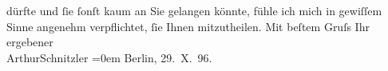 \begin{ledgroupsized}[t]{13cm}
               dürfte und ſie ſonſt kaum an Sie {\pb}gelangen
               könnte, fühle ich mich in gewiſſem Sinne angenehm verpflichtet, ſie Ihnen
               mitzutheilen.\pend
           \pstart
           Mit beſtem Gruſs Ihr ergebener{\\[\baselineskip]}\spacefill\mbox{ArthurSchnitzler}\pend
           \leftskip=0em{}\pstart
           Berlin, 29. X. 96.\pend
           
         
         \endnumbering{}\end{ledgroupsized}  \newcommand{\dateiname}{L00611}\newcommand{\titel}{Arthur Schnitzler an Peter Altenberg, 29. 10. 1896}\newcommand{\editorInnen}{Martin Anton Müller und Gerd-Hermann Susen}
      